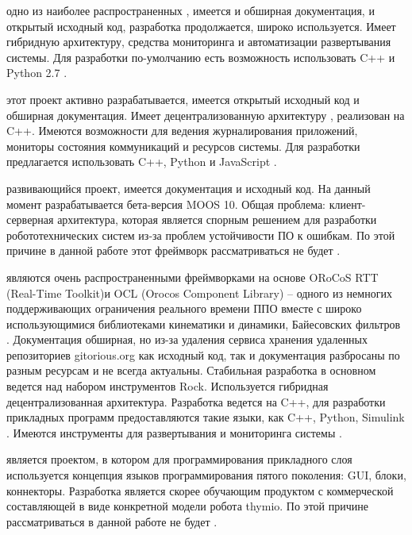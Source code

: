 \begin{description}[noitemsep]
	\item [ROS] одно из наиболее распространенных \marm{}, имеется и обширная документация, и открытый исходный код, разработка продолжается, широко используется. Имеет гибридную архитектуру, средства мониторинга и автоматизации развертывания системы. Для разработки по-умолчанию есть возможность использовать C++ и Python 2.7 \cite{ros-main-site}.

	\item[MIRA] этот проект активно разрабатывается, имеется открытый исходный код и обширная документация. Имеет децентрализованную архитектуру \cite{einhorn2012mira}, реализован на C++. Имеются возможности для ведения журналирования приложений, мониторы состояния коммуникаций и ресурсов системы. Для разработки предлагается использовать C++, Python и JavaScript \cite{mira-main-site}.

	\item [MOOS] развивающийся проект, имеется документация и исходный код. На данный момент разрабатывается бета-версия MOOS 10. Общая проблема: клиент-серверная архитектура, которая является спорным решением для разработки робототехнических систем из-за проблем устойчивости ПО к ошибкам. По этой причине в данной работе этот фреймворк рассматриваться не будет \cite{moos-main-site}.
		
	\item [ORoCoS Toolchain и Rock] являются очень распространенными фреймворками на основе ORoCoS RTT (Real-Time Toolkit)и OCL (Orocos Component Library) -- одного из немногих поддерживающих ограничения реального времени ППО вместе с широко использующимися библиотеками кинематики и динамики, Байесовских фильтров \etc. Документация обширная, но из-за удаления сервиса хранения удаленных репозиториев gitorious.org \cite{gitorious-valhala} как исходный код, так и документация разбросаны по разным ресурсам и не всегда актуальны. Стабильная разработка в основном ведется над набором инструментов Rock. Используется гибридная децентрализованная архитектура. Разработка ведется на C++, для разработки прикладных программ предоставляются такие языки, как C++, Python, Simulink \cite{blasco2012multiagent}. Имеются инструменты для развертывания и мониторинга системы \cite{orocos-toolchain-main-site,rock-main-site}.
	
	\item [ASEBA] является проектом, в котором для программирования прикладного слоя используется концепция языков программирования пятого поколения: GUI, блоки, коннекторы. Разработка является скорее обучающим продуктом с коммерческой составляющей в виде конкретной модели робота thymio. По этой причине рассматриваться в данной работе не будет \cite{aseba-main-site}.
	

\end{description}
